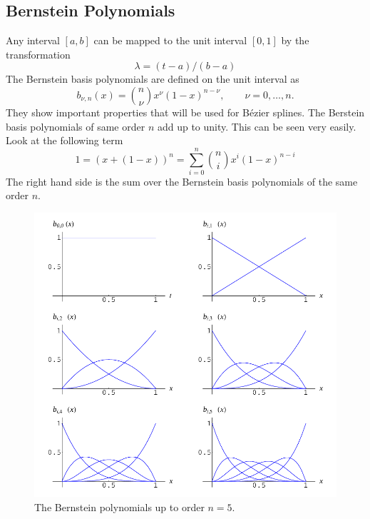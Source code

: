 \subsection{Bernstein Polynomials}
Any interval $[a,b]$ can be mapped to the unit interval $[0,1]$ by the transformation
\[
\lambda=(t-a)/(b-a)
\]
The Bernstein basis polynomials are defined on the unit interval as
\begin{equation}
	 b_{\nu,n}(x) = \binom{n}{\nu} x^{\nu} (1-x)^{n-\nu}, \qquad \nu=0,\ldots,n. 
	\label{eq:Bernsteinbasis}
\end{equation}
They show important properties that will be used for B\'ezier splines. The
Berstein basis polynomials of same order $n$ add up to unity. This can be seen
very easily. Look at the following term
\[ 1=\left(x+(1-x)\right)^n=\sum_{i=0}^n \binom{n}{i} x^i(1-x)^{n-i}\]
The right hand side is the sum over the Bernstein basis polynomials of the same
order $n$.
\begin{figure}[!ht]
\begin{center}
\includegraphics[width=\textwidth]{fig/BernsteinPol}
\caption{The Bernstein polynomials up to order $n=5$.\label{fig:BerPol}}
\end{center}
\end{figure}

